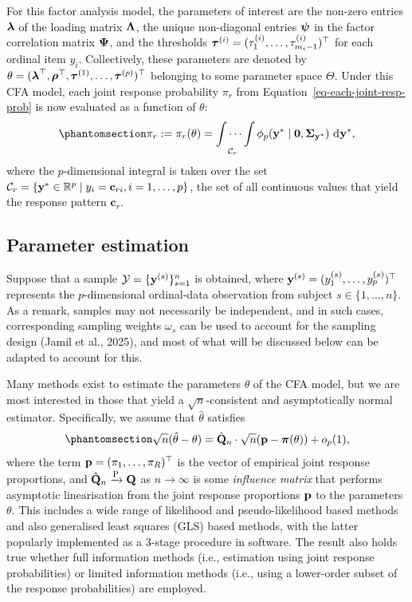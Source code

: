 \documentclass[
  letterpaper,
  DIV=11,
  numbers=noendperiod]{scrartcl}
\begin{document}
For this factor analysis model, the parameters of interest are the
non-zero entries \({\boldsymbol\lambda}\) of the loading matrix \({\boldsymbol\Lambda}\), the
unique non-diagonal entries \({\boldsymbol\psi}\) in the factor correlation matrix
\({\boldsymbol\Psi}\), and the thresholds
\({\boldsymbol\tau}^{(i)} = (\tau_1^{(i)},\dots,\tau_{m_i-1}^{(i)})^\top\) for each
ordinal item \(y_i\). Collectively, these parameters are denoted by
\(\theta = ({\boldsymbol\lambda}^\top,{\boldsymbol\rho}^\top,{\boldsymbol\tau}^{(1)},\dots,{\boldsymbol\tau}^{(p)})^\top\)
belonging to some parameter space \(\Theta\). Under this CFA model, each
joint response probability \(\pi_r\) from
Equation~\ref{eq-each-joint-resp-prob} is now evaluated as a function of
\(\theta\):
\begin{equation}\phantomsection\label{eq-joint-resp-prob-integral}{
\pi_r := \pi_r(\theta) = \idotsint \limits_{\mathcal C_r} \phi_p(\by^* \mid \bzero,\bSigma_{\by^*}) \, \dint\by^*,
}\end{equation} where the \(p\)-dimensional integral is taken over the
set
\(\mathcal C_r = \{ {\mathbf y}^* \in \mathbb{R}^p \mid y_i = \mathbf c_{ri}, i=1,\dots,p\}\),
the set of all continuous values that yield the response pattern
\(\mathbf c_r\).

\subsection{Parameter estimation}\label{parameter-estimation}

Suppose that a sample \(\mathcal Y = \{{\mathbf y}^{(s)}\}_{s=1}^n\) is
obtained, where \({\mathbf y}^{(s)} = (y_1^{(s)},\ldots,y_p^{(s)})^\top\)
represents the \(p\)-dimensional ordinal-data observation from subject
\(s\in\{1,\dots,n\}\). As a remark, samples may not necessarily be
independent, and in such cases, corresponding sampling weights
\(\omega_s\) can be used to account for the sampling design (Jamil et
al., 2025), and most of what will be discussed below can be adapted to
account for this.

Many methods exist to estimate the parameters \(\theta\) of the CFA
model, but we are most interested in those that yield a
\(\sqrt{n}\)-consistent and asymptotically normal estimator.
Specifically, we assume that \(\hat\theta\) satisfies
\begin{equation}\phantomsection\label{eq-theta-consistent}{
\begin{aligned}
\sqrt{n}(\hat\theta - \theta) = \hat\bQ_n \cdot \sqrt{n}(\bp - \bpi(\theta)) + o_p(1),
\end{aligned}
}\end{equation} where the term \({\mathbf p} = (\pi_1,\ldots,\pi_R)^\top\) is
the vector of empirical joint response proportions, and
\(\hat{{\mathbf Q}}_n \xrightarrow{\text P} {\mathbf Q}\) as \(n\to\infty\) is some
\emph{influence matrix} that performs asymptotic linearisation from the
joint response proportions \({\mathbf p}\) to the parameters \(\theta\). This
includes a wide range of likelihood and pseudo-likelihood based methods
and also generalised least squares (GLS) based methods, with the latter
popularly implemented as a 3-stage procedure in software. The result
also holds true whether full information methods (i.e., estimation using
joint response probabilities) or limited information methods (i.e.,
using a lower-order subset of the response probabilities) are employed.
\end{document}
